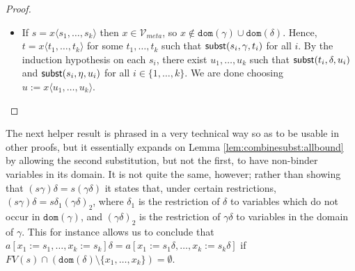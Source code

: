 \documentclass{lmcs}
\theoremstyle{theorem}\newtheorem{theorem}{Theorem}
\theoremstyle{theorem}\newtheorem{lemma}[theorem]{Lemma}
\theoremstyle{theorem}\newtheorem{corollary}[theorem]{Corollary}
\theoremstyle{definition}\newtheorem{definition}[theorem]{Definition}
\theoremstyle{definition}\newtheorem{example}[theorem]{Example}
\newcommand{\Vmeta}{\mathcal{V}_{\mathit{meta}}}
\newcommand{\FV}{\mathit{FV}}
\newcommand{\domain}{\mathtt{dom}}
\newcommand{\avar}{x}
\newcommand{\bvar}{y}
\newcommand{\cvar}{z}
\newcommand{\abs}[2]{\lambda #1.#2}
\newcommand{\meta}[2]{#1\langle#2\rangle}
\begin{document}
\begin{proof}
{\begin{itemize}
      Now let $\delta^{\bvar:=\cvar} = [\bvar:=\cvar] \cup [w:=\delta(w) \mid w \in \domain(\delta)
      \setminus \{\bvar\}]$ and let $\eta^{\avar:=\cvar} = [\avar:=\cvar] \cup [w:=\eta(w) \mid w \in
      \domain(\eta) \setminus \{\avar\}]$.  Then clearly $\subrel{\gamma^{\avar:=\bvar}(w),\delta^{
      \bvar:=\cvar},\eta^{\avar:=\cvar}(w)}$ for all $w \in \FV(s')$:
      \begin{itemize}
      \item for $w = \avar$ we have $\subrel{\bvar,\delta^{\bvar:=\cvar},\cvar}$;
      \item and for all other $w$ we have $\subrel{\gamma(w),\delta^{\bvar:=\cvar},\eta(w)}$ by Lemma
        \ref{lem:substextend},because $\bvar \notin \FV(\gamma(w))$ when $w \in \FV(s) = \FV(s')
        \setminus \{\avar\}$ (by choice of $\bvar$).
      \end{itemize}
      \ \\
      Hence, we can apply the induction hypothesis on $\subrel{s',\gamma^{\avar:=\bvar},t'}$ to obtain
      $u'$ such that both $\subrel{t',\delta^{\bvar;=\cvar},u'}$ and $\subrel{s',\eta^{\avar:=\cvar},
      u'}$.  We choose $u := \abs{\cvar}{u'}$.  Due to the requirements on $\cvar'$ we have both
      $\subrel{t,\delta,u}$ and $\subrel{s,\eta,u}$.
    \item If $s = \meta{\avar}{s_1,\dots,s_k}$ then $\avar \in \Vmeta$, so $\avar \notin \domain(\gamma)
      \cup \domain(\delta)$.  Hence, $t = \meta{\avar}{t_1,\dots,t_k}$ for some $t_1,\dots,t_k$ such that
      $\mathsf{subst}(s_i,\gamma,t_i)$ for all $i$.  By the induction hypothesis on each $s_i$, there exist
      $u_1,\dots,u_k$ such that $\mathsf{subst}(t_i,\delta,u_i)$ and $\mathsf{subst}(s_i,\eta,u_i)$ for all $i \in
      \{1,\dots,k\}$.  We are done choosing $u := \meta{\avar}{u_1,\dots,u_k}$.
      \qedhere
    \end{itemize}
}
\end{proof}

The next helper result is phrased in a very technical way so as to be usable in other proofs, but
it essentially expands on Lemma \ref{lem:combinesubst:allbound} by allowing the second substitution,
but not the first, to have non-binder variables in its domain.  It is not quite the same, however;
rather than showing that $(s\gamma)\delta = s(\gamma\delta)$ it states that, under certain
restrictions, $(s\gamma)\delta = s\delta_1(\gamma\delta)_2$, where $\delta_1$ is the
restriction of $\delta$ to variables which do not occur in $\domain(\gamma)$, and $(\gamma\delta)_2$
is the restriction of $\gamma\delta$ to variables in the domain of $\gamma$.
This for instance allows us to conclude that $a[\avar_1:=s_1,\dots,\avar_k:=s_k]\delta =
a[\avar_1:=s_1\delta,\dots,\avar_k:=s_k\delta]$ if $\FV(s) \cap (\domain(\delta) \setminus
\{\avar_1,\dots,\avar_k\}) = \emptyset$.
\end{document}
